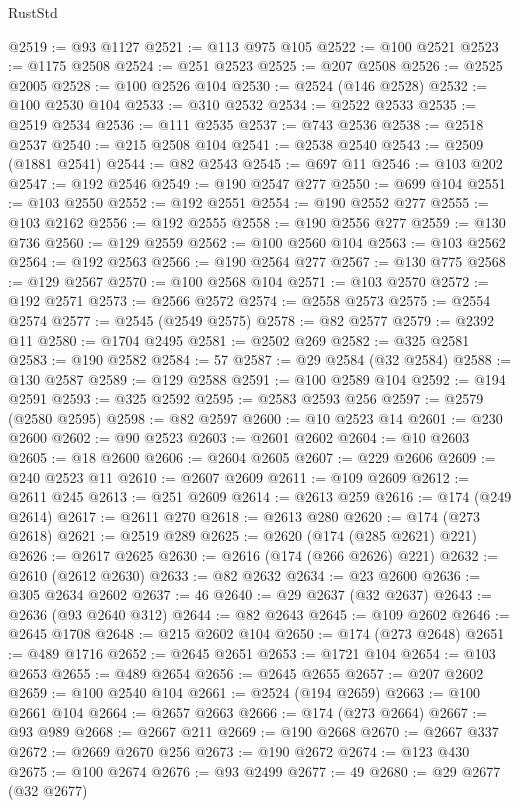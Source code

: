 \begin{lexlean}{RustStd}
\begin{coremodule}
{\begin{coremodule}
{{{{{{{{{{{{{{{{{{{{{{{{{{{{{{{{{{{{{{{{{{{{{{{{{{{{{{{@2519 := @93 @1127
@2521 := @113 @975 @105
@2522 := @100 @2521
@2523 := @1175 @2508
@2524 := @251 @2523
@2525 := @207 @2508
@2526 := @2525 @2005
@2528 := @100 @2526 @104
@2530 := @2524 (@146 @2528)
@2532 := @100 @2530 @104
@2533 := @310 @2532
@2534 := @2522 @2533
@2535 := @2519 @2534
@2536 := @111 @2535
@2537 := @743 @2536
@2538 := @2518 @2537
@2540 := @215 @2508 @104
@2541 := @2538 @2540
@2543 := @2509 (@1881 @2541)
@2544 := @82 @2543
@2545 := @697 @11
@2546 := @103 @202
@2547 := @192 @2546
@2549 := @190 @2547 @277
@2550 := @699 @104
@2551 := @103 @2550
@2552 := @192 @2551
@2554 := @190 @2552 @277
@2555 := @103 @2162
@2556 := @192 @2555
@2558 := @190 @2556 @277
@2559 := @130 @736
@2560 := @129 @2559
@2562 := @100 @2560 @104
@2563 := @103 @2562
@2564 := @192 @2563
@2566 := @190 @2564 @277
@2567 := @130 @775
@2568 := @129 @2567
@2570 := @100 @2568 @104
@2571 := @103 @2570
@2572 := @192 @2571
@2573 := @2566 @2572
@2574 := @2558 @2573
@2575 := @2554 @2574
@2577 := @2545 (@2549 @2575)
@2578 := @82 @2577
@2579 := @2392 @11
@2580 := @1704 @2495
@2581 := @2502 @269
@2582 := @325 @2581
@2583 := @190 @2582
@2584 := 57
@2587 := @29 @2584 (@32 @2584)
@2588 := @130 @2587
@2589 := @129 @2588
@2591 := @100 @2589 @104
@2592 := @194 @2591
@2593 := @325 @2592
@2595 := @2583 @2593 @256
@2597 := @2579 (@2580 @2595)
@2598 := @82 @2597
@2600 := @10 @2523 @14
@2601 := @230 @2600
@2602 := @90 @2523
@2603 := @2601 @2602
@2604 := @10 @2603
@2605 := @18 @2600
@2606 := @2604 @2605
@2607 := @229 @2606
@2609 := @240 @2523 @11
@2610 := @2607 @2609
@2611 := @109 @2609
@2612 := @2611 @245
@2613 := @251 @2609
@2614 := @2613 @259
@2616 := @174 (@249 @2614)
@2617 := @2611 @270
@2618 := @2613 @280
@2620 := @174 (@273 @2618)
@2621 := @2519 @289
@2625 := @2620 (@174 (@285 @2621) @221)
@2626 := @2617 @2625
@2630 := @2616 (@174 (@266 @2626) @221)
@2632 := @2610 (@2612 @2630)
@2633 := @82 @2632
@2634 := @23 @2600
@2636 := @305 @2634 @2602
@2637 := 46
@2640 := @29 @2637 (@32 @2637)
@2643 := @2636 (@93 @2640 @312)
@2644 := @82 @2643
@2645 := @109 @2602
@2646 := @2645 @1708
@2648 := @215 @2602 @104
@2650 := @174 (@273 @2648)
@2651 := @489 @1716
@2652 := @2645 @2651
@2653 := @1721 @104
@2654 := @103 @2653
@2655 := @489 @2654
@2656 := @2645 @2655
@2657 := @207 @2602
@2659 := @100 @2540 @104
@2661 := @2524 (@194 @2659)
@2663 := @100 @2661 @104
@2664 := @2657 @2663
@2666 := @174 (@273 @2664)
@2667 := @93 @989
@2668 := @2667 @211
@2669 := @190 @2668
@2670 := @2667 @337
@2672 := @2669 @2670 @256
@2673 := @190 @2672
@2674 := @123 @430
@2675 := @100 @2674
@2676 := @93 @2499
@2677 := 49
@2680 := @29 @2677 (@32 @2677)
}}}}}}}}}}}}}}}}}}}}}}}}}}}}}}}}}}}}}}}}}}}}}}}}}}}}}}}
\end{coremodule}}
\end{coremodule}
\end{lexlean}
